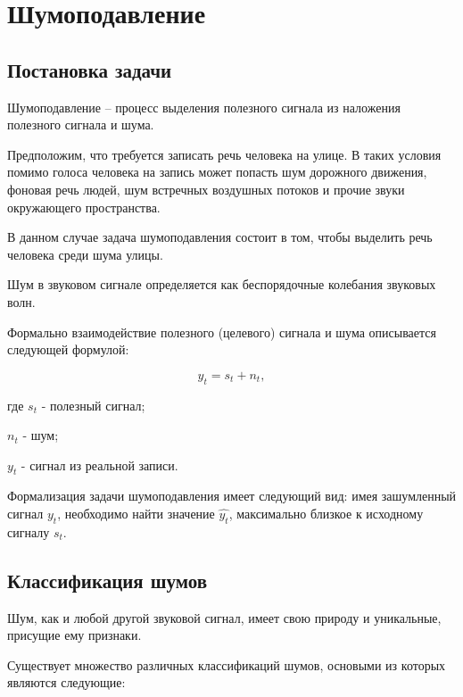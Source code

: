 \section{Шумоподавление}

\subsection{Постановка задачи}

Шумоподавление -- процесс выделения полезного сигнала из наложения
полезного сигнала и шума.

Предположим, что требуется записать речь человека на улице.
В таких условия помимо голоса человека на запись может попасть
шум дорожного движения,
фоновая речь людей,
шум встречных воздушных потоков 
и прочие звуки окружающего пространства.

В данном случае задача шумоподавления состоит в том, чтобы выделить
речь человека среди шума улицы. 

Шум в звуковом сигнале определяется как беспорядочные колебания
звуковых волн.

Формально взаимодействие полезного (целевого) сигнала и шума
описывается следующей формулой:

\begin{equation*}
    \textstyle y_t = s_t + n_t, 
\end{equation*}

\begin{explanation}
    \item[где]  $s_t$   - полезный сигнал;
    \item       $n_t$   - шум;
    \item       $y_t$   - сигнал из реальной записи.
\end{explanation}

Формализация задачи шумоподавления имеет следующий вид:
имея зашумленный сигнал $y_t$, 
необходимо найти значение $\hat{y_t}$, 
максимально близкое к исходному сигналу $s_t$.

\subsection{Классификация шумов}

Шум, как и любой другой звуковой сигнал, 
имеет свою природу и уникальные, присущие
ему признаки.

Существует множество различных классификаций шумов, основыми из которых
являются следующие:

